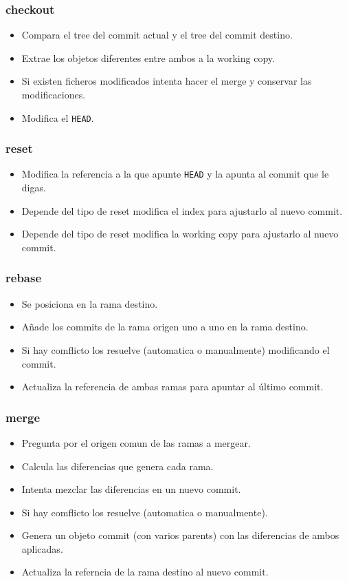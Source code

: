 \documentclass[10pt]{beamer}
\begin{document}
  \begin{frame}[containsverbatim]
    \frametitle{checkout}
    \begin{itemize}
      \item Compara el tree del commit actual y el tree del commit destino.
      \item Extrae los objetos diferentes entre ambos a la working copy.
      \item Si existen ficheros modificados intenta hacer el merge y conservar las modificaciones.
      \item Modifica el \verb+HEAD+.
    \end{itemize}
  \end{frame}

  \begin{frame}[containsverbatim]
    \frametitle{reset}
    \begin{itemize}
      \item Modifica la referencia a la que apunte \verb+HEAD+ y la apunta al commit que le digas.
      \item Depende del tipo de reset modifica el index para ajustarlo al nuevo commit.
      \item Depende del tipo de reset modifica la working copy para ajustarlo al nuevo commit.
    \end{itemize}
  \end{frame}

  \begin{frame}[containsverbatim]
    \frametitle{rebase}
    \begin{itemize}
      \item Se posiciona en la rama destino.
      \item Añade los commits de la rama origen uno a uno en la rama destino.
      \item Si hay comflicto los resuelve (automatica o manualmente) modificando el commit.
      \item Actualiza la referencia de ambas ramas para apuntar al último commit.
    \end{itemize}
  \end{frame}

  \begin{frame}[containsverbatim]
    \frametitle{merge}
    \begin{itemize}
      \item Pregunta por el origen comun de las ramas a mergear.
      \item Calcula las diferencias que genera cada rama.
      \item Intenta mezclar las diferencias en un nuevo commit.
      \item Si hay comflicto los resuelve (automatica o manualmente).
      \item Genera un objeto commit (con varios parents) con las diferencias de ambos aplicadas.
      \item Actualiza la referncia de la rama destino al nuevo commit.
    \end{itemize}
  \end{frame}
\end{document}
